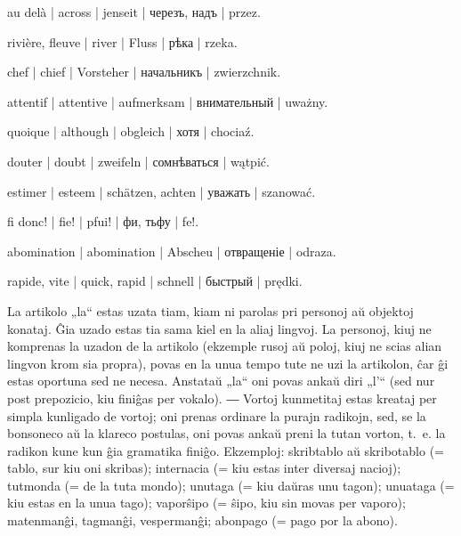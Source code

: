 \begin{ekzvocab}{1em}
 au delà | across | jenseit | черезъ, надъ | przez.

 rivière, fleuve | river | Fluss | рѣка | rzeka.

 chef | chief | Vorsteher | начальникъ | zwierzchnik.

 attentif | attentive | aufmerksam | внимательный | uważny.

 quoique | although | obgleich | хотя | chociaź.

 douter | doubt | zweifeln | сомнѣваться | wątpić.

 estimer | esteem | schätzen, achten | уважать | szanować.

 fi donc! | fie! | pfui! | фи, тьфу | fe!.

 abomination | abomination | Abscheu | отвращеніе | odraza.

 rapide, vite | quick, rapid | schnell | быстрый | prędki.

\end{ekzvocab}

\newpage %


La artikolo „la“ estas uzata tiam, kiam ni parolas pri personoj aŭ objektoj konataj. Ĝia uzado estas tia sama\unuakomon{} kiel en la aliaj lingvoj. La personoj, kiuj ne komprenas la uzadon de la artikolo (ekzemple rusoj aŭ poloj, kiuj ne scias alian lingvon krom sia propra), povas en la unua tempo tute ne uzi la artikolon, ĉar ĝi estas oportuna sed ne necesa. Anstataŭ „la“ oni povas ankaŭ diri „l’“ (sed nur post prepozicio, kiu finiĝas per vokalo). ― Vortoj kunmetitaj estas kreataj per simpla kunligado de vortoj; oni prenas ordinare la purajn radikojn, sed, se la bonsoneco aŭ la klareco postulas, oni povas ankaŭ preni la tutan vorton, t.~e. la radikon kune kun ĝia gramatika finiĝo. Ekzemploj: skribtablo aŭ skribotablo (= tablo, sur kiu oni skribas); internacia (= kiu estas inter diversaj nacioj); tutmonda (= de la tuta mondo); unutaga (= kiu daŭras unu tagon); unuataga (= kiu estas en la unua tago); vaporŝipo (= ŝipo, kiu sin movas per vaporo); matenmanĝi, tagmanĝi, vespermanĝi; abonpago (= pago por la abono).

